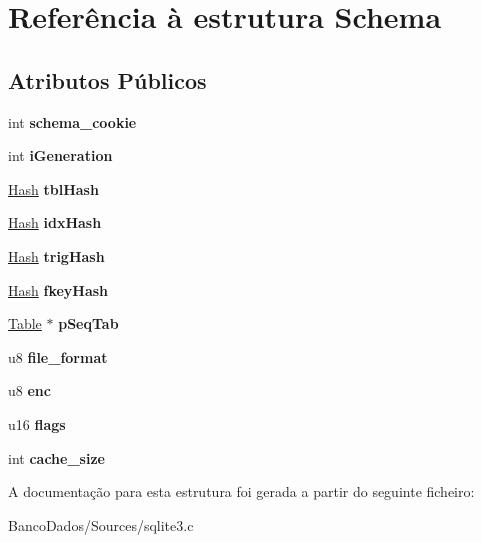 \hypertarget{struct_schema}{\section{Referência à estrutura Schema}
\label{struct_schema}
}
\subsection*{Atributos Públicos}
\begin{DoxyCompactItemize}
\item 
\hypertarget{struct_schema_a3eef54a64f4f962d64577646bd34a47c}{int {\bfseries schema\-\_\-cookie}}\label{struct_schema_a3eef54a64f4f962d64577646bd34a47c}

\item 
\hypertarget{struct_schema_a879b1597656c7cbcbb98cdb88e876874}{int {\bfseries i\-Generation}}\label{struct_schema_a879b1597656c7cbcbb98cdb88e876874}

\item 
\hypertarget{struct_schema_af841eadc93b289944b95f72b784bfaae}{\hyperlink{struct_hash}{Hash} {\bfseries tbl\-Hash}}\label{struct_schema_af841eadc93b289944b95f72b784bfaae}

\item 
\hypertarget{struct_schema_ac0dd242f486d17ddadca1e47af76c6c5}{\hyperlink{struct_hash}{Hash} {\bfseries idx\-Hash}}\label{struct_schema_ac0dd242f486d17ddadca1e47af76c6c5}

\item 
\hypertarget{struct_schema_ab521f4545d200329d8e1a46bbb67e7c5}{\hyperlink{struct_hash}{Hash} {\bfseries trig\-Hash}}\label{struct_schema_ab521f4545d200329d8e1a46bbb67e7c5}

\item 
\hypertarget{struct_schema_ad51ed96351701cfe8d9e871722827c11}{\hyperlink{struct_hash}{Hash} {\bfseries fkey\-Hash}}\label{struct_schema_ad51ed96351701cfe8d9e871722827c11}

\item 
\hypertarget{struct_schema_ad580e4e662724bee95571d297f94da37}{\hyperlink{struct_table}{Table} $\ast$ {\bfseries p\-Seq\-Tab}}\label{struct_schema_ad580e4e662724bee95571d297f94da37}

\item 
\hypertarget{struct_schema_ab9f0371436e41b3080772995407a4cca}{u8 {\bfseries file\-\_\-format}}\label{struct_schema_ab9f0371436e41b3080772995407a4cca}

\item 
\hypertarget{struct_schema_a1338d09fe9cbb5a8162929202cb73cae}{u8 {\bfseries enc}}\label{struct_schema_a1338d09fe9cbb5a8162929202cb73cae}

\item 
\hypertarget{struct_schema_a14838766a0a438e590a27f300beff459}{u16 {\bfseries flags}}\label{struct_schema_a14838766a0a438e590a27f300beff459}

\item 
\hypertarget{struct_schema_a0a66691be95a30c099ca4840da7110dd}{int {\bfseries cache\-\_\-size}}\label{struct_schema_a0a66691be95a30c099ca4840da7110dd}

\end{DoxyCompactItemize}


A documentação para esta estrutura foi gerada a partir do seguinte ficheiro\-:\begin{DoxyCompactItemize}
\item 
Banco\-Dados/\-Sources/sqlite3.\-c\end{DoxyCompactItemize}
